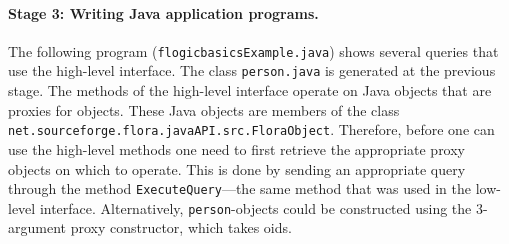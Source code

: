 \paragraph{Stage 3: Writing Java application programs.}

The following program ({\tt flogicbasicsExample.java}) shows several
queries that use the high-level interface. The
class {\tt person.java} is generated at the previous stage.
The methods of the high-level interface operate on Java objects that are
proxies for \FLORA objects. These Java objects are members of the class
{\tt net.sourceforge.flora.javaAPI.src.FloraObject}.
Therefore, before one can use the high-level methods one need to first
retrieve the appropriate proxy objects on which to operate. This is done
by sending an appropriate query through the method {\tt ExecuteQuery}---the
same method that was used in the low-level interface.
Alternatively, {\tt person}-objects could be constructed using the
3-argument proxy constructor, which takes \fl oids.


